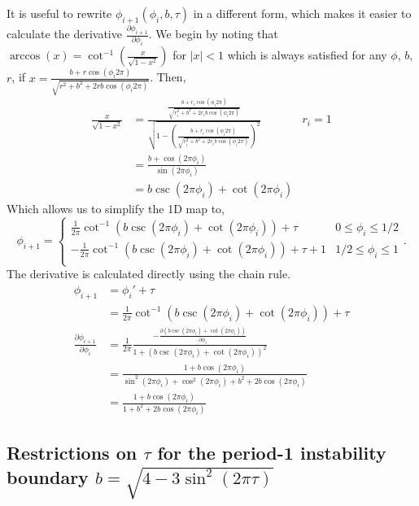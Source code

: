 \indent It is useful to rewrite $\phi_{i+1}(\phi_i,b,\tau)$ in a different form, which makes it easier to calculate the derivative $\frac{\partial \phi_{i+1}}{\partial \phi_i}$. We begin by noting that $\arccos(x) = \cot^{-1}(\frac{x}{\sqrt{1-x^2}})$ for $|x|<1$ which is always satisfied for any $\phi$, $b$, $r$, if $x=\frac{b+r \cos(\phi_i 2\pi)}{\sqrt{r^2+b^2+2rb\cos(\phi_i 2\pi)}}$. Then, 
\begin{align}
    \frac{x}{\sqrt{1-x^2}} &= \frac{\frac{b+r_i \cos(\phi_i 2\pi)}{\sqrt{r_i^2+b^2+2r_i b\cos(\phi_i 2\pi)}}}{\sqrt{1-(\frac{b+r_i \cos(\phi_i 2\pi)}{\sqrt{r_i^2+b^2+2r_i b\cos(\phi_i 2\pi)}})^2}} & r_i = 1 \nonumber \\
    &= \frac{b + \cos(2\pi \phi_i)}{\sin(2\pi \phi_i)} \nonumber \\
    &= b\csc(2\pi \phi_i) + \cot(2\pi \phi_i)
\end{align} 
Which allows us to simplify the 1D map to,
\begin{equation}
    \phi_{i+1} =
\begin{cases}
        \frac{1}{2\pi}\cot^{-1}(b\csc(2\pi \phi_i)+\cot(2\pi \phi_i))+ \tau & 0 \leq \phi_i \leq 1/2 \\
       -\frac{1}{2\pi}\cot^{-1}(b\csc(2\pi \phi_i)+\cot(2\pi \phi_i))+ \tau + 1 & 1/2 \leq \phi_i \leq 1 \\
    \end{cases}.
\end{equation}
The derivative is calculated directly using the chain rule.
\begin{align}
    \phi_{i+1} &= \phi_i' + \tau \nonumber \\
    &= \frac{1}{2\pi}\cot^{-1}(b\csc(2\pi \phi_i)+\cot(2\pi \phi_i))+ \tau \nonumber \\
    \frac{\partial \phi_{i+1}}{\partial \phi_i} &= \frac{1}{2\pi} \frac{-\frac{\partial (b\csc(2\pi \phi_i)+\cot(2\pi \phi_i))}{\partial \phi_i}}{1+(b\csc(2\pi \phi_i)+\cot(2\pi \phi_i))^2} \nonumber \\
    &= \frac{1+b\cos(2\pi \phi_i)}{\sin^2(2\pi \phi_i)+\cos^2(2\pi \phi_i) + b^2 + 2b\cos(2\pi \phi_i)} \nonumber \\
    &=\frac{1+b\cos(2\pi \phi_i)}{1 + b^2 + 2b\cos(2\pi \phi_i)}
\end{align}

\subsection{Restrictions on $\tau$ for the period-1 instability boundary $b = \sqrt{4-3\sin^2(2\pi\tau)}$} \label{supp: sub2}

